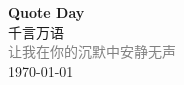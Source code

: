 \vspace*{\fill}
\begin{center}
    \textcolor{orange!50}{\Huge\textbf{Quote Day}} \\[1em]
    \textcolor{orange!60!pink}{\Large 千言万语} \\[2em]
    \textcolor{gray}{\large 让我在你的沉默中安静无声} \\[1em]
    \today
\end{center}
\vspace*{\fill}
\clearpage


\clearpage

\clearpage

\clearpage
